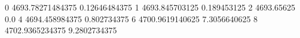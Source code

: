0 4693.78271484375 0.12646484375
1 4693.845703125 0.189453125
2 4693.65625 0.0
4 4694.458984375 0.802734375
6 4700.9619140625 7.3056640625
8 4702.9365234375 9.2802734375
